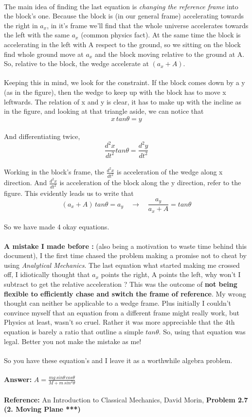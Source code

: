 \documentclass[10pt]{article}
\begin{document}
\\
The main idea of finding the last equation is \emph{changing the reference frame} into the block's one. Because the block is (in our general frame) accelerating towards the right in $a_x$, in it's frame we'll find that the whole universe accelerates towards the left with the same $a_x$ (common physics fact). At the same time the block is accelerating in the left with A respect to the ground, so we sitting on the block find whole ground move at $a_x$ and the block moving relative to the ground at A. So, relative to the block, the wedge accelerate at $(a_x + A)$. \\
\\
Keeping this in mind, we look for the constraint. If the block comes down by a y (as in the figure), then the wedge to keep up with the block has to move x leftwards. The relation of x and y is clear, it has to make up with the incline as in the figure, and looking at that triangle aside, we can notice that 
\[x \, tan\theta = y\] \\
And differentiating twice,
\[ \frac{d^2 x}{dt^2} tan\theta = \frac{d^2 y}{dt^2}\] \\
Working in the block's frame, the $\frac{d^2 x}{dt^2}$ is acceleration of the wedge along x direction. And $\frac{d^2 x}{dt^2}$ is acceleration of the block along the y direction, refer to the figure. This evidently leads us to write that
\begin{equation}
(a_x + A) \, tan\theta = a_y
\quad \longrightarrow \quad
\frac{a_y}{a_x + A} = tan\theta 
\end{equation}
\\
So we have made 4 okay equations. 
\\
\\
\textbf{\textsf{A mistake I made before :}} (also being a motivation to waste time behind this document), I the first time chased the problem making a promise not to cheat by using \emph{Analytical Mechanics}. The last equation what started making me crossed off, I idiotically thought that $a_x$ points the right, A points the left, why won't I subtract to get the relative acceleration ? This was the outcome of \textbf{not being flexible to efficiently chase and switch the frame of reference}. My wrong thought can neither be applicable to a wedge frame. Plus initially I couldn't convince myself that an equation from a different frame might really work, but Physics at least, wasn't so cruel. Rather it was more appreciable that the 4th equation is barely a ratio that outline a simple $tan\theta$. So, using that equation was legal. Better you not make the mistake as me!
\\
\\
So you have these equation's and I leave it as a worthwhile algebra problem.\\ 
\\
\textbf{\textsf{Answer:}} $A = \frac{mg\, sin\theta \, cos \theta}{M + m\, sin^2\theta}$
\\
\\
\textbf{\textsf{Reference:}} \textsf{ An Introduction to Classical Mechanics, David Morin, \textbf{Problem 2.7 (2. Moving Plane ***)}}
\end{document}
